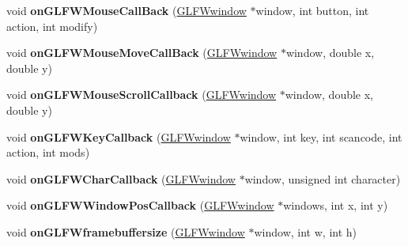\begin{DoxyCompactItemize}
\item 
\mbox{\label{classGLViewImpl_af027af43c0b1432110689b352aa521e1}} 
void {\bfseries on\+G\+L\+F\+W\+Mouse\+Call\+Back} (\hyperlink{group__window_ga3c96d80d363e67d13a41b5d1821f3242}{G\+L\+F\+Wwindow} $\ast$window, int button, int action, int modify)
\item 
\mbox{\label{classGLViewImpl_a509ab080c7593b004876c7e3eef1ec88}} 
void {\bfseries on\+G\+L\+F\+W\+Mouse\+Move\+Call\+Back} (\hyperlink{group__window_ga3c96d80d363e67d13a41b5d1821f3242}{G\+L\+F\+Wwindow} $\ast$window, double x, double y)
\item 
\mbox{\label{classGLViewImpl_afa18e1ffd59d59d94f8d97b5552767dc}} 
void {\bfseries on\+G\+L\+F\+W\+Mouse\+Scroll\+Callback} (\hyperlink{group__window_ga3c96d80d363e67d13a41b5d1821f3242}{G\+L\+F\+Wwindow} $\ast$window, double x, double y)
\item 
\mbox{\label{classGLViewImpl_a82c0895fe2f0b245e2273cc41e6019b4}} 
void {\bfseries on\+G\+L\+F\+W\+Key\+Callback} (\hyperlink{group__window_ga3c96d80d363e67d13a41b5d1821f3242}{G\+L\+F\+Wwindow} $\ast$window, int key, int scancode, int action, int mods)
\item 
\mbox{\label{classGLViewImpl_a257794d0cb81e4aa486e58b79e012ac3}} 
void {\bfseries on\+G\+L\+F\+W\+Char\+Callback} (\hyperlink{group__window_ga3c96d80d363e67d13a41b5d1821f3242}{G\+L\+F\+Wwindow} $\ast$window, unsigned int character)
\item 
\mbox{\label{classGLViewImpl_aa6e838ce1067abc29d0b7adc8a21d0a4}} 
void {\bfseries on\+G\+L\+F\+W\+Window\+Pos\+Callback} (\hyperlink{group__window_ga3c96d80d363e67d13a41b5d1821f3242}{G\+L\+F\+Wwindow} $\ast$windows, int x, int y)
\item 
\mbox{\label{classGLViewImpl_af23c5c26aaf15d7929c08c562d8cd875}} 
void {\bfseries on\+G\+L\+F\+Wframebuffersize} (\hyperlink{group__window_ga3c96d80d363e67d13a41b5d1821f3242}{G\+L\+F\+Wwindow} $\ast$window, int w, int h)
\item 
\mbox{\label{classGLViewImpl_a1e45eb1b8b4383de1198619034a8fcd6}} 

\end{DoxyCompactItemize}
